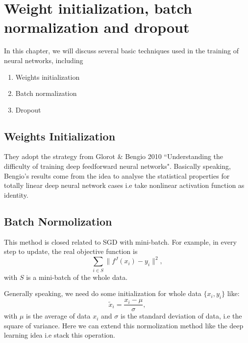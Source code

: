 \chapter{Weight initialization, batch normalization and dropout}
In this chapter, we will discuss several basic techniques used in the training of neural networks, including
\begin{enumerate}
\item Weights initialization
\item Batch normalization
\item Dropout
\end{enumerate}
\section{Weights Initialization}
They adopt the strategy from Glorot \& Bengio 2010 ``Understanding the difficulty of training deep feedforward neural networks". Basically speaking, Bengio's results come from the idea to analyse the statistical properties for totally linear deep neural network cases i.e take nonlinear activation function as identity.

\section{Batch Normolization}
This method is closed related to SGD with mini-batch. For example, in every step to update, the real objective function is
\begin{equation}
\sum_{i \in S} \|f^J(x_i) - y_i\|^2,
\end{equation}
with $S$ is a mini-batch of the whole data.

Generally speaking, we need do some initialization for whole data $\{x_i, y_i\}$ like:
\begin{equation}
\tilde x_{i} = \frac{x_i - \mu}{\sigma},
\end{equation}
with $\mu$ is the average of data $x_i$ and $\sigma$ is the standard deviation of data, i.e the square of variance. Here we can extend this normolization method like the deep learning idea i.e stack this operation.

